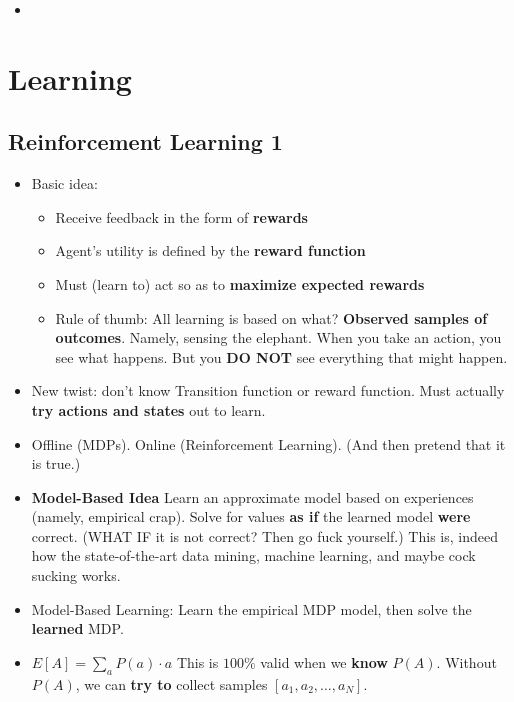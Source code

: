 \documentclass[twocolumn]{article}
\begin{document}
\begin{itemize}
\item 
\end{itemize}

\section{Learning}
\label{sec:learning}


\subsection{Reinforcement Learning 1}
\label{sec:reinf-learn-1}

\begin{itemize}
\item Basic idea:
  \begin{itemize}
  \item Receive feedback in the form of \textbf{rewards}
  \item Agent's utility is defined by the \textbf{reward function}
  \item Must (learn to) act so as to \textbf{maximize expected
      rewards}
  \item Rule of thumb: All learning is based on what? \textbf{Observed
    samples of outcomes}. Namely, sensing the elephant. When you take
  an action, you see what happens. But you \textbf{DO NOT} see
  everything that might happen.
  \end{itemize}
\item New twist: don't know Transition function or reward
  function. Must actually \textbf{try actions and states} out to
  learn. 
\item Offline (MDPs). Online (Reinforcement Learning). (And then
  pretend that it is true.)
\item \textbf{Model-Based Idea} Learn an approximate model based on
  experiences (namely, empirical crap). Solve for values \textbf{as
    if} the learned model \textbf{were} correct. (WHAT IF it is not
  correct? Then go fuck yourself.) This is, indeed how the
  state-of-the-art data mining, machine learning, and maybe cock
  sucking works.
\item Model-Based Learning: Learn the empirical MDP model, then solve
  the \textbf{learned} MDP.
\item $E[A]=\sum_{a}P(a)\cdot a$ This is $100\%$ valid when we
  \textbf{know} $P(A)$. Without $P(A)$, we can \textbf{try to} collect
  samples $[a_{1},a_{2},\ldots,a_{N}]$.
  \begin{itemize}

\end{itemize}
\end{itemize}
\end{document}
